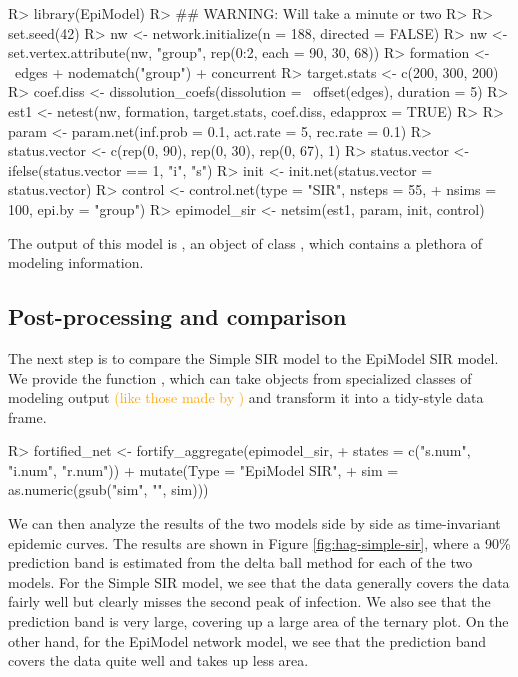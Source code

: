 \documentclass[
  shortnames]{jss}
\begin{document}
\begin{CodeChunk}
\begin{CodeInput}
R> library(EpiModel)
R> ## WARNING:  Will take a minute or two
R> 
R> set.seed(42)
R> nw <- network.initialize(n = 188, directed = FALSE)
R> nw <- set.vertex.attribute(nw, "group", rep(0:2, each = 90, 30, 68))
R> formation <- ~edges + nodematch("group") + concurrent
R> target.stats <- c(200, 300, 200)
R> coef.diss <- dissolution_coefs(dissolution = ~offset(edges),  duration = 5)
R> est1 <- netest(nw, formation, target.stats, coef.diss, edapprox = TRUE)
R> 
R> param <- param.net(inf.prob = 0.1, act.rate = 5, rec.rate = 0.1)
R> status.vector <- c(rep(0, 90), rep(0, 30), rep(0, 67), 1)
R> status.vector <- ifelse(status.vector == 1, "i", "s")
R> init <- init.net(status.vector = status.vector)
R> control <- control.net(type = "SIR", nsteps = 55,
+                        nsims = 100, epi.by = "group")
R> epimodel_sir <- netsim(est1, param, init, control)
\end{CodeInput}
\end{CodeChunk}

The output of this model is , an object of class
, which contains a plethora of modeling information.

\hypertarget{post-processing-and-comparison}{%
\subsection{Post-processing and
comparison}\label{post-processing-and-comparison}}

The next step is to compare the Simple SIR model to the EpiModel SIR
model. We provide the function , which can
take objects from specialized classes of modeling output
\textcolor{orange}{(like those made by )} and transform
it into a tidy-style data frame.

\begin{CodeChunk}
\begin{CodeInput}
R> fortified_net <- fortify_aggregate(epimodel_sir, 
+                                    states = c("s.num", "i.num", "r.num")) %
+   mutate(Type = "EpiModel SIR",
+          sim = as.numeric(gsub("sim", "", sim)))
\end{CodeInput}
\end{CodeChunk}

We can then analyze the results of the two models side by side as
time-invariant epidemic curves. The results are shown in Figure
\ref{fig:hag-simple-sir}, where a 90\% prediction band is estimated from
the delta ball method for each of the two models. For the Simple SIR
model, we see that the data generally covers the data fairly well but
clearly misses the second peak of infection. We also see that the
prediction band is very large, covering up a large area of the ternary
plot. On the other hand, for the EpiModel network model, we see that the
prediction band covers the data quite well and takes up less area.
\end{document}

